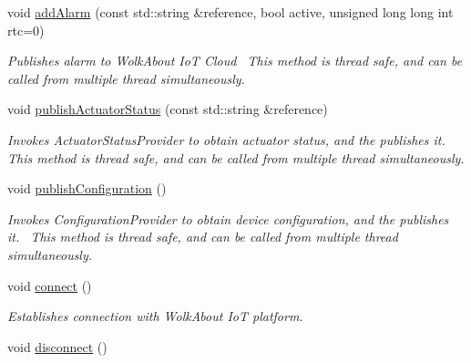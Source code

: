 \begin{DoxyCompactItemize}
void \hyperlink{classwolkabout_1_1Wolk_a8bcc9b4aab0fde2de3483d5d2e09e557}{add\+Alarm} (const std\+::string \&reference, bool active, unsigned long long int rtc=0)
\begin{DoxyCompactList}\small\item\em Publishes alarm to Wolk\+About IoT Cloud~\newline
 This method is thread safe, and can be called from multiple thread simultaneously. \end{DoxyCompactList}\item 
void \hyperlink{classwolkabout_1_1Wolk_a44615f58380fb36be1f2c21c5423469a}{publish\+Actuator\+Status} (const std\+::string \&reference)
\begin{DoxyCompactList}\small\item\em Invokes Actuator\+Status\+Provider to obtain actuator status, and the publishes it.~\newline
 This method is thread safe, and can be called from multiple thread simultaneously. \end{DoxyCompactList}\item 
void \hyperlink{classwolkabout_1_1Wolk_a07c1144ebaf09975fa8e9d2cdc908fe5}{publish\+Configuration} ()\hypertarget{classwolkabout_1_1Wolk_a07c1144ebaf09975fa8e9d2cdc908fe5}{}\label{classwolkabout_1_1Wolk_a07c1144ebaf09975fa8e9d2cdc908fe5}

\begin{DoxyCompactList}\small\item\em Invokes Configuration\+Provider to obtain device configuration, and the publishes it.~\newline
 This method is thread safe, and can be called from multiple thread simultaneously. \end{DoxyCompactList}\item 
void \hyperlink{classwolkabout_1_1Wolk_ae78f0c33b71e8d33861de8547de1c311}{connect} ()\hypertarget{classwolkabout_1_1Wolk_ae78f0c33b71e8d33861de8547de1c311}{}\label{classwolkabout_1_1Wolk_ae78f0c33b71e8d33861de8547de1c311}

\begin{DoxyCompactList}\small\item\em Establishes connection with Wolk\+About IoT platform. \end{DoxyCompactList}\item 
void \hyperlink{classwolkabout_1_1Wolk_a805c8f842b1e4a480ac1a8bc1b6add06}{disconnect} ()\hypertarget{classwolkabout_1_1Wolk_a805c8f842b1e4a480ac1a8bc1b6add06}{}\label{classwolkabout_1_1Wolk_a805c8f842b1e4a480ac1a8bc1b6add06}


\end{DoxyCompactItemize}
